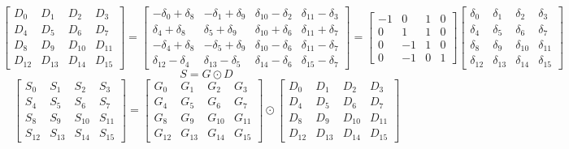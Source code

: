 \documentclass{article}%
\begin{document}
\[%
\left[\begin{matrix}D_{0} & D_{1} & D_{2} & D_{3}\\D_{4} & D_{5} & D_{6} & D_{7}\\D_{8} & D_{9} & D_{10} & D_{11}\\D_{12} & D_{13} & D_{14} & D_{15}\end{matrix}\right] = \left[\begin{matrix}- \delta_{0} + \delta_{8} & - \delta_{1} + \delta_{9} & \delta_{10} - \delta_{2} & \delta_{11} - \delta_{3}\\\delta_{4} + \delta_{8} & \delta_{5} + \delta_{9} & \delta_{10} + \delta_{6} & \delta_{11} + \delta_{7}\\- \delta_{4} + \delta_{8} & - \delta_{5} + \delta_{9} & \delta_{10} - \delta_{6} & \delta_{11} - \delta_{7}\\\delta_{12} - \delta_{4} & \delta_{13} - \delta_{5} & \delta_{14} - \delta_{6} & \delta_{15} - \delta_{7}\end{matrix}\right] = \left[\begin{matrix}-1 & 0 & 1 & 0\\0 & 1 & 1 & 0\\0 & -1 & 1 & 0\\0 & -1 & 0 & 1\end{matrix}\right] \left[\begin{matrix}\delta_{0} & \delta_{1} & \delta_{2} & \delta_{3}\\\delta_{4} & \delta_{5} & \delta_{6} & \delta_{7}\\\delta_{8} & \delta_{9} & \delta_{10} & \delta_{11}\\\delta_{12} & \delta_{13} & \delta_{14} & \delta_{15}\end{matrix}\right]%
\]%
\[%
S = G \odot D%
\]%
\[%
\left[\begin{matrix}S_{0} & S_{1} & S_{2} & S_{3}\\S_{4} & S_{5} & S_{6} & S_{7}\\S_{8} & S_{9} & S_{10} & S_{11}\\S_{12} & S_{13} & S_{14} & S_{15}\end{matrix}\right] = \left[\begin{matrix}G_{0} & G_{1} & G_{2} & G_{3}\\G_{4} & G_{5} & G_{6} & G_{7}\\G_{8} & G_{9} & G_{10} & G_{11}\\G_{12} & G_{13} & G_{14} & G_{15}\end{matrix}\right] \odot \left[\begin{matrix}D_{0} & D_{1} & D_{2} & D_{3}\\D_{4} & D_{5} & D_{6} & D_{7}\\D_{8} & D_{9} & D_{10} & D_{11}\\D_{12} & D_{13} & D_{14} & D_{15}\end{matrix}\right]%
\]%
\end{document}
